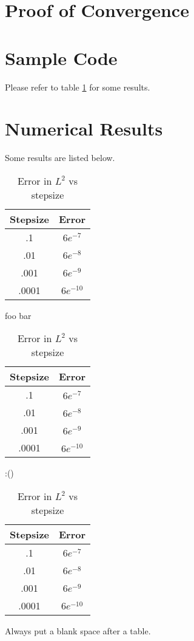 \documentclass[11pt]{article}
\numberwithin{equation}{section}
\begin{document}
\section{Proof of Convergence}
\section{Sample Code}
\lstset{caption=Basic Scheme}

\lstset{caption=Lubich Scheme}

Please refer to table \ref{some_table} for some results.
\section{Numerical Results}
Some results are listed below.
\begin{table}[H]
	\caption{Error in $L^2$ vs stepsize}
	\label{some_table}
	\begin{center}
	\begin{tabular}{|c|c|}
	\hline
	Stepsize & Error \\ \hline
	.1 & $6e^{-7}$ \\ \hline
	.01 & $6e^{-8}$ \\ \hline
	.001 & $6e^{-9}$ \\ \hline
	.0001 & $6e^{-10}$ \\
	\hline
	\end{tabular}
	\end{center}
\end{table}
foo bar
\begin{table}[H]
	\caption{Error in $L^2$ vs stepsize}
	\label{some_table_2}
	\begin{center}
	\begin{tabular}{|c|c|}
	\hline
	Stepsize & Error \\ \hline
	.1 & $6e^{-7}$ \\ \hline
	.01 & $6e^{-8}$ \\ \hline
	.001 & $6e^{-9}$ \\ \hline
	.0001 & $6e^{-10}$ \\
	\hline
	\end{tabular}
	\end{center}
\end{table}
:()
\begin{table}[H]
	\caption{Error in $L^2$ vs stepsize}
	\label{some_table_3}
	\begin{center}
	\begin{tabular}{|c|c|}
	\hline
	Stepsize & Error \\ \hline
	.1 & $6e^{-7}$ \\ \hline
	.01 & $6e^{-8}$ \\ \hline
	.001 & $6e^{-9}$ \\ \hline
	.0001 & $6e^{-10}$ \\
	\hline
	\end{tabular}
	\end{center}
\end{table}
Always put a blank space after a table.
\end{document}
